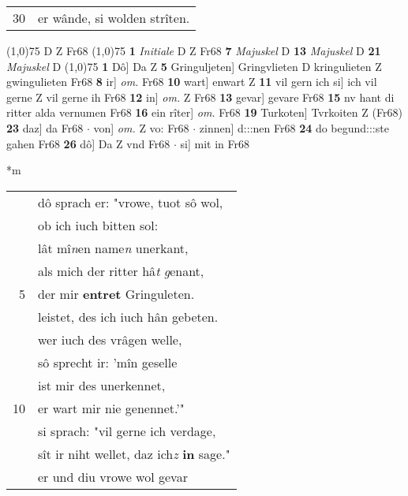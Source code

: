 \documentclass[8pt,a4paper,notitlepage]{article}
\begin{document}
\begin{table}[ht]
\begin{minipage}[t]{0.5\linewidth}
\begin{tabular}{rl}
30 & er wânde, si wolden strîten.\\ 
\end{tabular}
\scriptsize
\line(1,0){75} \newline
D Z Fr68 \newline
\line(1,0){75} \newline
\textbf{1} \textit{Initiale} D Z Fr68  \textbf{7} \textit{Majuskel} D  \textbf{13} \textit{Majuskel} D  \textbf{21} \textit{Majuskel} D  \newline
\line(1,0){75} \newline
\textbf{1} Dô] Da Z \textbf{5} Gringuljeten] Gringvlieten D kringulieten Z gwingulieten Fr68 \textbf{8} ir] \textit{om.} Fr68 \textbf{10} wart] enwart Z \textbf{11} vil gern ich si] ich vil gerne Z vil gerne ih Fr68 \textbf{12} in] \textit{om.} Z Fr68 \textbf{13} gevar] gevare Fr68 \textbf{15} nv hant di ritter alda vernumen Fr68 \textbf{16} ein rîter] \textit{om.} Fr68 \textbf{19} Turkoten] Tvrkoiten Z (Fr68) \textbf{23} daz] da Fr68  $\cdot$ von] \textit{om.} Z vo: Fr68  $\cdot$ zinnen] d:::nen Fr68 \textbf{24} do begund:::ste gahen Fr68 \textbf{26} dô] Da Z vnd Fr68  $\cdot$ si] mit in Fr68 \newline
\end{minipage}
\hspace{0.5cm}
\begin{minipage}[t]{0.5\linewidth}
\small
\begin{center}*m
\end{center}
\begin{tabular}{rl}
 & dô sprach er: "vrowe, tuot sô wol,\\ 
 & ob ich iuch bitten sol:\\ 
 & lât mî\textit{n}en name\textit{n} unerkant,\\ 
 & als mich der ritter hâ\textit{t} \textit{g}enant,\\ 
5 & der mir \textbf{entret} Gringuleten.\\ 
 & leistet, des ich iuch hân gebeten.\\ 
 & wer iuch des vrâgen welle,\\ 
 & sô sprecht ir: 'mîn geselle\\ 
 & ist mir des unerkennet,\\ 
10 & er wart mir nie genennet.'"\\ 
 & si sprach: "vil gerne ich verdage,\\ 
 & sît ir niht wellet, daz ich\textit{z} \textbf{in} sage."\\ 
 & er und diu vrowe wol gevar\\ 

\end{tabular}
\end{minipage}
\end{table}
\end{document}
